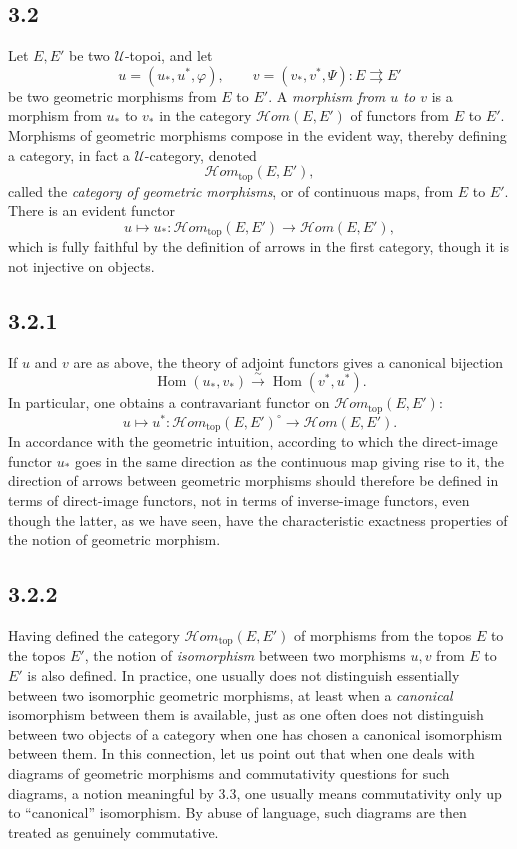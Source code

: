 \documentclass[11pt]{article}
\newcommand{\U}{\mathcal{U}}
\newcommand{\Hom}{\operatorname{Hom}}
\newcommand{\Hhom}{\mathcal{H}om}
\newcommand{\Hhomtop}{\mathcal{H}om_{\mathrm{top}}}
\begin{document}
\subsection*{3.2}
Let \(E,E'\) be two \(\U\)-topoi, and let
\[
u=(u_\ast,u^\ast,\varphi),
\qquad
v=(v_\ast,v^\ast,\Psi):E\rightrightarrows E'
\]
be two geometric morphisms from \(E\) to \(E'\). A \emph{morphism from \(u\) to \(v\)} is a morphism from \(u_\ast\) to \(v_\ast\) in the category \(\Hhom(E,E')\) of functors from \(E\) to \(E'\). Morphisms of geometric morphisms compose in the evident way, thereby defining a category, in fact a \(\U\)-category, denoted
\[
\Hhomtop(E,E'),
\]
called the \emph{category of geometric morphisms}, or of continuous maps, from \(E\) to \(E'\). There is an evident functor
\[
u\longmapsto u_\ast:
\Hhomtop(E,E')\longrightarrow\Hhom(E,E'),
\]
which is fully faithful by the definition of arrows in the first category, though it is not injective on objects.

\subsection*{3.2.1}
If \(u\) and \(v\) are as above, the theory of adjoint functors gives a canonical bijection
\[
\Hom(u_\ast,v_\ast)\xrightarrow{\sim}\Hom(v^\ast,u^\ast).
\]
In particular, one obtains a contravariant functor on \(\Hhomtop(E,E')\):
\[
u\longmapsto u^\ast:
\Hhomtop(E,E')^\circ\longrightarrow\Hhom(E,E').
\]
In accordance with the geometric intuition, according to which the direct-image functor \(u_\ast\) goes in the same direction as the continuous map giving rise to it, the direction of arrows between geometric morphisms should therefore be defined in terms of direct-image functors, not in terms of inverse-image functors, even though the latter, as we have seen, have the characteristic exactness properties of the notion of geometric morphism.

\subsection*{3.2.2}
Having defined the category \(\Hhomtop(E,E')\) of morphisms from the topos \(E\) to the topos \(E'\), the notion of \emph{isomorphism} between two morphisms \(u,v\) from \(E\) to \(E'\) is also defined. In practice, one usually does not distinguish essentially between two isomorphic geometric morphisms, at least when a \emph{canonical} isomorphism between them is available, just as one often does not distinguish between two objects of a category when one has chosen a canonical isomorphism between them. In this connection, let us point out that when one deals with diagrams of geometric morphisms and commutativity questions for such diagrams, a notion meaningful by 3.3, one usually means commutativity only up to ``canonical'' isomorphism. By abuse of language, such diagrams are then treated as genuinely commutative.
\end{document}
